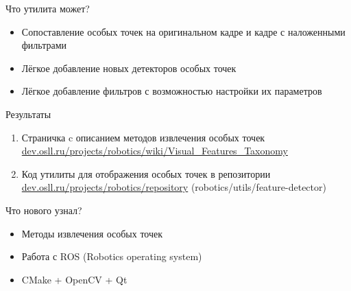 \begin{frame}{Что утилита может?}
\begin{itemize}
	\item Сопоставление особых точек на оригинальном кадре и кадре с наложенными фильтрами 
	\item Лёгкое добавление новых детекторов особых точек
	\item Лёгкое добавление фильтров с возможностью настройки их параметров
\end{itemize}
\end{frame}

\begin{frame}{Результаты}
\begin{enumerate}
	\item Страничка c описанием методов извлечения особых точек \url{dev.osll.ru/projects/robotics/wiki/Visual_Features_Taxonomy}
	\item Код утилиты для отображения особых точек в репозитории \url{dev.osll.ru/projects/robotics/repository} (robotics/utils/feature-detector)
\end{enumerate}
\end{frame}

\begin{frame}{Что нового узнал?}
\begin{itemize}
	\item Методы извлечения особых точек
	\item Работа с ROS (Robotics operating system)
	\item CMake + OpenCV + Qt
\end{itemize}
\end{frame}



